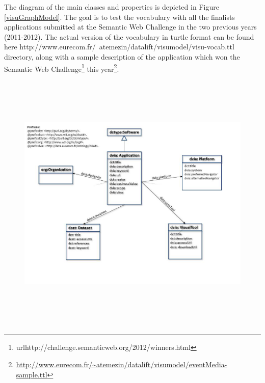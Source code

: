 \documentclass[a4paper,11pt]{report}
\begin{document}
The diagram of the main classes and properties is depicted in Figure \ref{visuGraphModel}. The goal is to test the vocabulary with all the finalists applications submitted at the Semantic Web Challenge in  the two previous years (2011-2012). The actual version of the vocabulary in turtle format can be found here http://www.eurecom.fr/~atemezin/datalift/visumodel/visu-vocab.ttl directory, along with a sample description of the application which won the Semantic Web Challenge\footnote{url{http://challenge.semanticweb.org/2012/winners.html}} this year\footnote{\url{http://www.eurecom.fr/~atemezin/datalift/visumodel/eventMedia-sample.ttl}}.

\begin{landscape}
\begin{figure}[!htbp]
  \begin{center}
    \ifpdf
      \includegraphics[height=5in]{visuGraphModel.jpg}
    \else

\end{center}
\end{figure}
\end{landscape}
\end{document}
